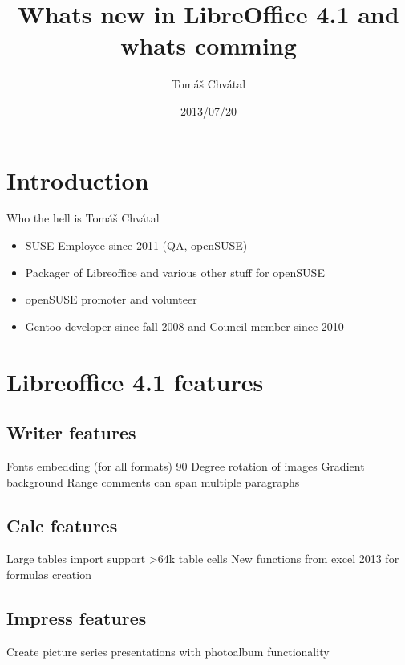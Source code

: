 \documentclass{beamer}
\author{Tom\'{a}\v{s} Chv\'{a}tal\newline {\small openSUSE Team}}
\title{Whats new in LibreOffice 4.1 and whats comming}
\date{2013/07/20}
\begin{document}
\begin{frame}[t,plain]
\titlepage
\end{frame}

\section{Introduction}

\begin{frame}[t]{Who the hell is Tomáš Chvátal}
	\begin{itemize}
	\item SUSE Employee since 2011 (QA, openSUSE)
	\item Packager of Libreoffice and various other stuff for openSUSE
	\item openSUSE promoter and volunteer
	\item Gentoo developer since fall 2008 and Council member since 2010
	\end{itemize}
\end{frame}

\section{Libreoffice 4.1 features}

\subsection{Writer features}

\begin{frame}
Fonts embedding (for all formats)
90 Degree rotation of images
Gradient background
Range comments can span multiple paragraphs
\end{frame}

\subsection{Calc features}

\begin{frame}
Large tables import support >64k table cells
New functions from excel 2013 for formulas creation
\end{frame}

\subsection{Impress features}

\begin{frame}
Create picture series presentations with photoalbum functionality
\end{frame}
\end{document}
